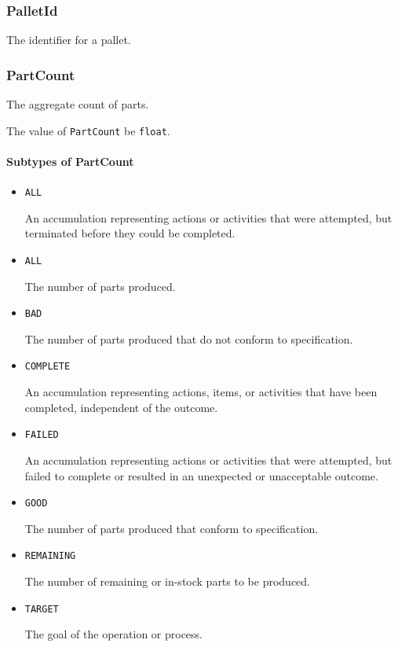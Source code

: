 \subsubsection{PalletId}
\label{sec:PalletId}



The identifier for a pallet.



\subsubsection{PartCount}
\label{sec:PartCount}



The aggregate count of parts.


The value of \texttt{PartCount} \MUST be \texttt{float}.


\paragraph{Subtypes of PartCount}\mbox{}
\label{sec:Subtypes of PartCount}

\begin{itemize}

\item \texttt{ALL}


An accumulation representing actions or activities that were attempted, but terminated before they could be completed.

\item \texttt{ALL}


The number of parts produced. 

\item \texttt{BAD}


The number of parts produced that do not conform to specification.

\item \texttt{COMPLETE}


An accumulation representing actions, items, or activities that have been completed, independent of the outcome.

\item \texttt{FAILED}


An accumulation representing actions or activities that were attempted, but failed to
complete or resulted in an unexpected or unacceptable outcome.

\item \texttt{GOOD}


The number of parts produced that conform to specification.


\item \texttt{REMAINING}


The number of remaining or in-stock parts to be produced.

\item \texttt{TARGET}


The goal of the operation or process.


\end{itemize}











